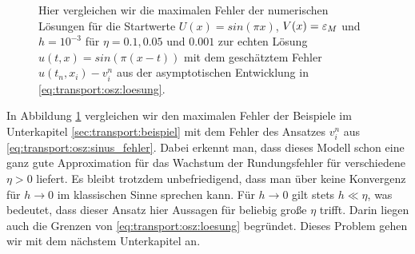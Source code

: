 \begin{figure}
\centering
{}
\caption{Hier vergleichen wir die maximalen Fehler der numerischen Lösungen für die Startwerte $U(x) = sin(\pi x)$, $V(x) = \varepsilon_M$ und $h = 10^{-3}$ für $\eta = 0.1, 0.05$ und $0.001$ zur echten Lösung $u(t,x) = sin(\pi(x - t))$ mit dem geschätztem Fehler $u(t_n, x_i) - v^n_i$ aus der asymptotischen Entwicklung in \eqref{eq:transport:osz:loesung}.}
\label{fig:transport:osz:max_error}
\end{figure}

In Abbildung \ref{fig:transport:osz:max_error} vergleichen wir den maximalen Fehler der Beispiele im Unterkapitel \ref{sec:transport:beispiel} mit dem Fehler des Ansatzes $v^n_i$ aus \eqref{eq:transport:osz:sinus_fehler}.
Dabei erkennt man, dass dieses Modell schon eine ganz gute Approximation für das Wachstum der Rundungsfehler für verschiedene $\eta > 0$ liefert.
Es bleibt trotzdem unbefriedigend, dass man über keine Konvergenz für $h \to 0$ im klassischen Sinne sprechen kann.
Für $h \to 0$ gilt stets $h \ll \eta$, was bedeutet, dass dieser Ansatz hier Aussagen für beliebig große $\eta$ trifft.
Darin liegen auch die Grenzen von \eqref{eq:transport:osz:loesung} begründet.
Dieses Problem gehen wir mit dem nächstem Unterkapitel an.

